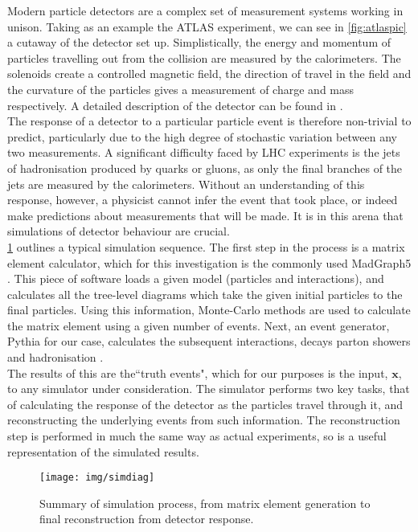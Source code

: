 \documentclass{report}
\begin{document}
Modern particle detectors are a complex set of measurement systems working in unison. Taking as an example the ATLAS experiment, we can see in \cref{fig:atlaspic} a cutaway of the detector set up. Simplistically, the energy and momentum of particles travelling out from the collision are measured by the calorimeters. The solenoids create a controlled magnetic field, the direction of travel in the field and the curvature of the particles gives a measurement of charge and mass respectively. A detailed description of the detector can be found in \cite{armstrong}.
\\


The response of a detector to a particular particle event is therefore non-trivial to predict, particularly due to the high degree of stochastic variation between any two measurements. A significant difficulty faced by LHC experiments is the jets of hadronisation produced by quarks or gluons, as only the final branches of the jets are measured by the calorimeters. Without an understanding of this response, however, a physicist cannot infer the event that took place, or indeed make predictions about measurements that will be made. It is in this arena that simulations of detector behaviour are crucial. \\

\cref{fig:simdiag} outlines a typical simulation sequence. The first step in the process is a matrix element calculator, which for this investigation is the commonly used MadGraph5 \cite{madgraph}. This piece of software loads a given model (particles and interactions), and calculates all the tree-level diagrams which take the given initial particles to the final particles. Using this information, Monte-Carlo methods are used to calculate the matrix element using a given number of events. Next, an event generator, Pythia for our case, calculates the subsequent interactions, decays parton showers and hadronisation \cite{Gieseke2012}.\\

The results of this are the``truth events", which for our purposes is the input, $\mathbf{x}$, to any simulator under consideration. The simulator performs two key tasks, that of calculating the response of the detector as the particles travel through it, and reconstructing the underlying events from such information. The reconstruction step is performed in much the same way as actual experiments, so is a useful representation of the simulated results.        

\begin{figure}[H]
	\centering
	\texttt{[image: img/simdiag]}
	
	\caption{Summary of simulation process, from matrix element generation to final reconstruction from detector response.}
	\label{fig:simdiag}
	
\end{figure}	
\end{document}
